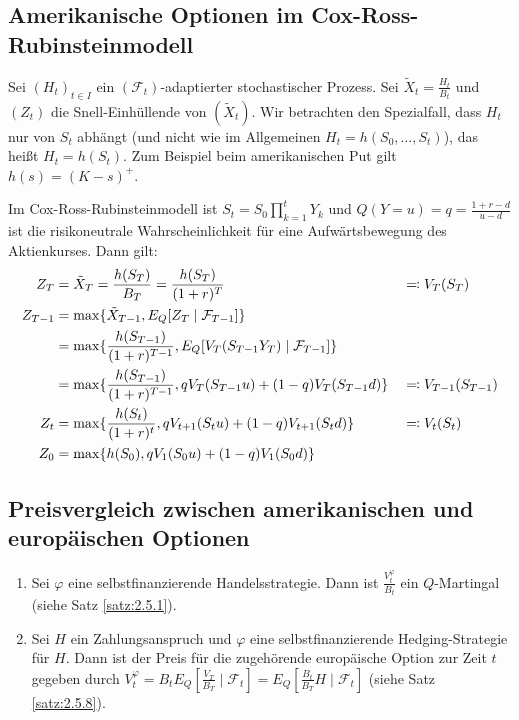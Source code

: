 \documentclass[a4paper,twoside,DIV15,BCOR12mm]{scrbook}
\newcommand{\cF}{\mathcal F}
\begin{document}
\subsection{Amerikanische Optionen im Cox-Ross-Rubinsteinmodell}

Sei $(H_t)_{t\in I}$ ein $(\cF_t)$-adaptierter stochastischer Prozess. Sei $\tilde X_t = \frac{H_t}{B_t}$ und $(Z_t)$ die Snell-Einhüllende von $(\tilde X_t)$. Wir betrachten den Spezialfall, dass $H_t$ nur von $S_t$ abhängt (und nicht wie im Allgemeinen  $H_t = h(S_0,\ldots,S_t)$), das heißt $H_t = h(S_t)$. Zum Beispiel beim amerikanischen Put gilt $h(s) = (K-s)^+$.

Im Cox-Ross-Rubinsteinmodell ist $S_t = S_0 \prod_{k=1}^t Y_k$ und $Q(Y=u) = q = \frac{1+r-d}{u-d}$ ist die risikoneutrale Wahrscheinlichkeit für eine Aufwärtsbewegung des Aktienkurses. Dann gilt:
\begin{align*}
Z_T &= \tilde X_T = \frac{h(S_T)}{B_T} = \frac{h(S_T)}{(1+r)^T} &&\ad V_T(S_T) \\
Z_{T-1} &= \max\{\tilde X_{T-1}, E_Q[Z_T\mid \cF_{T-1}]\} \\
&= \max \{\frac{h(S_{T-1})}{(1+r)^{T-1}} , E_Q[V_{T}(S_{T-1}Y_T) \mid \cF_{T-1}]\} \\
&= \max \{ \frac{h(S_{T-1})}{(1+r)^{T-1}}, q  V_T(S_{T-1} u) + (1-q) V_T(S_{T-1}d) \} &&\ad V_{T-1}(S_{T-1}) \\
Z_t &= \max \{ \frac{h(S_t)}{(1+r)^t} , q V_{t+1}(S_t u) + (1-q) V_{t+1}(S_t d)\} &&\ad V_{t}(S_t) \\
Z_0 &= \max \{h(S_0), q V_1(S_0u)+ (1-q)V_1(S_0d)\}
\end{align*}

\subsection{Preisvergleich zwischen amerikanischen und europäischen Optionen}

\begin{bemerkung}
\begin{enumerate}
\item Sei $\varphi$ eine selbstfinanzierende Handelsstrategie. Dann ist $\frac{V_t^\varphi}{B_t}$ ein $Q$-Martingal (siehe Satz \ref{satz:2.5.1}).
\item Sei $H$ ein Zahlungsanspruch und $\varphi$ eine selbstfinanzierende Hedging-Strategie für $H$. Dann ist der Preis für die zugehörende europäische Option zur Zeit $t$ gegeben durch $V_t^\varphi = B_t E_Q[\frac{V_T}{B_T} \mid \cF_t] = E_Q[ \frac{B_t}{B_T} H \mid \cF_t]$ (siehe Satz \ref{satz:2.5.8}).
\end{enumerate}
\end{bemerkung}
\end{document}
